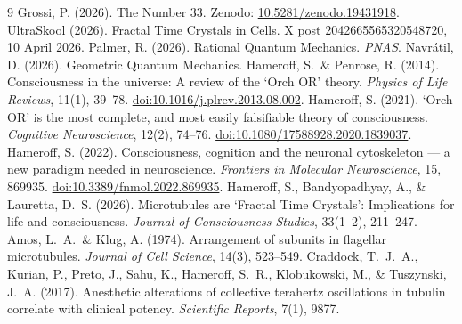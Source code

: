 \documentclass[11pt,a4paper]{article}
\theoremstyle{definition}
\theoremstyle{remark}
\begin{document}
\begin{thebibliography}{9}
 Grossi, P. (2026). The Number 33. Zenodo: \href{https://doi.org/10.5281/zenodo.19431918}{10.5281/zenodo.19431918}.
 UltraSkool (2026). Fractal Time Crystals in Cells. X post 2042665565320548720, 10 April 2026.
 Palmer, R. (2026). Rational Quantum Mechanics. \textit{PNAS}.
 Navr\'{a}til, D. (2026). Geometric Quantum Mechanics.
 Hameroff, S.\ \& Penrose, R. (2014). Consciousness in the universe: A review of the `Orch OR' theory. \textit{Physics of Life Reviews}, 11(1), 39--78. \href{https://doi.org/10.1016/j.plrev.2013.08.002}{doi:10.1016/j.plrev.2013.08.002}.
 Hameroff, S. (2021). `Orch OR' is the most complete, and most easily falsifiable theory of consciousness. \textit{Cognitive Neuroscience}, 12(2), 74--76. \href{https://doi.org/10.1080/17588928.2020.1839037}{doi:10.1080/17588928.2020.1839037}.
 Hameroff, S. (2022). Consciousness, cognition and the neuronal cytoskeleton --- a new paradigm needed in neuroscience. \textit{Frontiers in Molecular Neuroscience}, 15, 869935. \href{https://doi.org/10.3389/fnmol.2022.869935}{doi:10.3389/fnmol.2022.869935}.
 Hameroff, S., Bandyopadhyay, A., \& Lauretta, D.~S. (2026). Microtubules are `Fractal Time Crystals': Implications for life and consciousness. \textit{Journal of Consciousness Studies}, 33(1--2), 211--247.
 Amos, L.~A.\ \& Klug, A. (1974). Arrangement of subunits in flagellar microtubules. \textit{Journal of Cell Science}, 14(3), 523--549.
 Craddock, T.~J.~A., Kurian, P., Preto, J., Sahu, K., Hameroff, S.~R., Klobukowski, M., \& Tuszynski, J.~A. (2017). Anesthetic alterations of collective terahertz oscillations in tubulin correlate with clinical potency. \textit{Scientific Reports}, 7(1), 9877.
\end{thebibliography}
\end{document}
